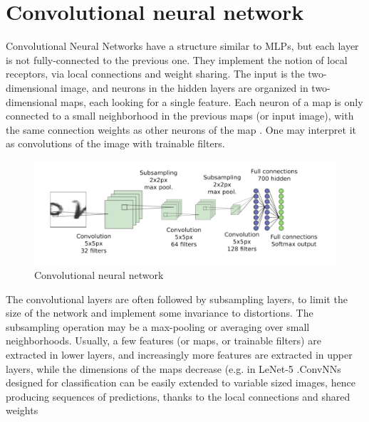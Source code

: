 \section{Convolutional neural network}
Convolutional Neural Networks  have a structure
similar to MLPs, but each layer is not fully-connected to the previous one. They
implement the notion of local receptors, via local connections and weight sharing. The
input is the two-dimensional image, and neurons in the hidden layers are organized in
two-dimensional maps, each looking for a single feature. Each neuron of a map is only
connected to a small neighborhood in the previous maps (or input image), with the
same connection weights as other neurons of the map . One may interpret
it as convolutions of the image with trainable filters.
\begin{figure}[h]
\centering
\includegraphics[width=15cm]{Figures/CNN.png}
\caption{ Convolutional neural network}
\label{fig:conv}
\end{figure}

The convolutional layers are often followed by subsampling layers, to limit the size of
the network and implement some invariance to distortions. The subsampling operation
may be a max-pooling or averaging over small neighborhoods. Usually, a few features
(or maps, or trainable filters) are extracted in lower layers, and increasingly more
features are extracted in upper layers, while the dimensions of the maps decrease (e.g.
in LeNet-5 .ConvNNs designed for classification can be easily extended to variable sized images,
hence producing sequences of predictions, thanks to the local connections and shared
weights

